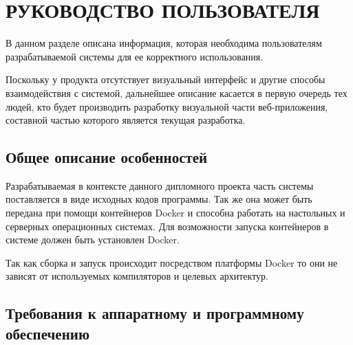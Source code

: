 \section{РУКОВОДСТВО ПОЛЬЗОВАТЕЛЯ}
\label{sec:manual}


В данном разделе описана информация, которая необходима пользователям разрабатываемой системы для ее корректного использования.


Поскольку у продукта отсутствует визуальный интерфейс и другие способы
взаимодействия с системой, дальнейшее описание касается в первую очередь тех людей, кто будет
производить разработку визуальной части веб-приложения, составной частью которого является текущая разработка.

\subsection{Общее описание особенностей}

Разрабатываемая в контексте данного дипломного проекта часть системы поставляется в виде исходных кодов программы.
Так же она может быть передана при помощи контейнеров Docker и способна работать на настольных и серверных операционных системах.
Для возможности запуска контейнеров в системе должен быть установлен Docker.

Так как сборка и запуск происходит посредством платформы Docker то они не зависят от используемых компиляторов и целевых архитектур.

\subsection{Требования к аппаратному и программному обеспечению}


